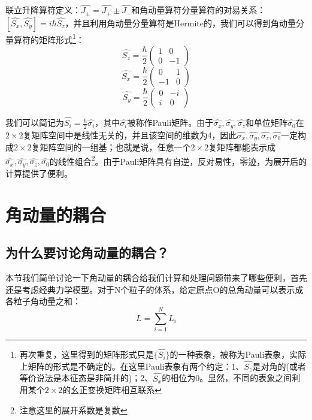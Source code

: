         联立升降算符定义：$\hat{J_\pm}=\hat{J_+}\pm \hat{J_-}$和角动量算符分量算符的对易关系：$[\hat{S_x},\hat{S_y}]=i\hbar\hat{S_z}$，并且利用角动量分量算符是Hermite的，我们可以得到角动量分量算符的矩阵形式\footnote{再次重复，这里得到的矩阵形式只是$\{\hat{S_i}\}$的一种表象，被称为Pauli表象，实际上矩阵的形式是不确定的。在这里Pauli表象有两个约定：1、$\hat{S_z}$是对角的(或者等价说法是本征态是非简并的)；2、$\hat{S_x}$的相位为0。显然，不同的表象之间利用某个$2\times2$的幺正变换矩阵相互联系}：
          \begin{equation}
        \hat{S_z}=\frac{\hbar}{2}
            \begin{pmatrix}
            1 & 0\\
            0 & -1
            \end{pmatrix}
        \end{equation}
          \begin{equation}
        \hat{S_x}=\frac{\hbar}{2}
            \begin{pmatrix}
            0 & 1\\
            -1 & 0
            \end{pmatrix}
        \end{equation}
          \begin{equation}
        \hat{S_y}=\frac{\hbar}{2}
            \begin{pmatrix}
            0 & -i\\
            i & 0
            \end{pmatrix}
        \end{equation}
       
       我们可以简记为$\hat{S_i}=\frac{\hbar}{2}\hat{\sigma_i}$，其中$\hat{\sigma_i}$被称作Pauli矩阵。由于$\hat{\sigma_x},\hat{\sigma_y},\hat{\sigma_z}\textrm{和单位矩阵}\hat{\sigma_0}$在$2\times2$复矩阵空间中是线性无关的，并且该空间的维数为4，因此$\hat{\sigma_x},\hat{\sigma_y},\hat{\sigma_z},\hat{\sigma_0}$一定构成$2\times2$复矩阵空间的一组基；也就是说，任意一个$2\times2$复矩阵都能表示成$\hat{\sigma_x},\hat{\sigma_y},\hat{\sigma_z},\hat{\sigma_0}$的线性组合\footnote{注意这里的展开系数是复数}。由于Pauli矩阵具有自逆，反对易性，零迹，为展开后的计算提供了便利。
\section{角动量的耦合}\label{section5:coupling}
    \subsection{为什么要讨论角动量的耦合？}\label{subsection5:coupling}
    本节我们简单讨论一下角动量的耦合给我们计算和处理问题带来了哪些便利，首先还是考虑经典力学模型。对于N个粒子的体系，给定原点O的总角动量可以表示成各粒子角动量之和：
    \begin{equation}
        L=\sum_{i=1}^{N}L_i
    \end{equation}
    
